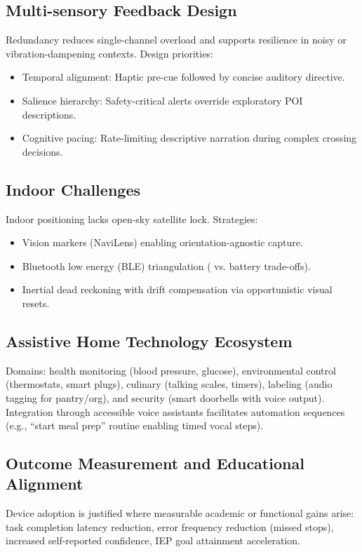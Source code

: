 \subsection{Multi-sensory Feedback Design}
Redundancy reduces single-channel overload and supports resilience in noisy or vibration-dampening contexts.\supercite{InclusiveCityMaker2023} Design priorities:
\begin{itemize}
	\item Temporal alignment: Haptic pre-cue followed by concise auditory directive.
	\item Salience hierarchy: Safety-critical alerts override exploratory POI descriptions.
	\item Cognitive pacing: Rate-limiting descriptive narration during complex crossing decisions.
\end{itemize}

\subsection{Indoor  Challenges}
Indoor positioning lacks open-sky satellite lock. Strategies:
\begin{itemize}
	\item Vision markers (NaviLens) enabling orientation-agnostic capture.\supercite{navilens}
	\item Bluetooth low energy (BLE) triangulation ( vs. battery trade-offs).
	\item Inertial dead reckoning with drift compensation via opportunistic visual resets.
\end{itemize}

\subsection{Assistive Home Technology Ecosystem}
Domains: health monitoring (blood pressure, glucose), environmental control (thermostats, smart plugs), culinary  (talking scales, timers), labeling (audio tagging for pantry/org), and security (smart doorbells with voice output).\supercite{AllAboutVision2023, MarketResearch2025} Integration through accessible voice assistants facilitates automation sequences (e.g., “start meal prep” routine enabling timed vocal steps).

\subsection{Outcome Measurement and Educational Alignment}
Device adoption is justified where measurable academic or functional  gains arise: task completion latency reduction, error frequency reduction (missed stops), increased self-reported confidence, IEP goal attainment acceleration.\supercite{StudentOutcomesResearch, wjaets2024}

